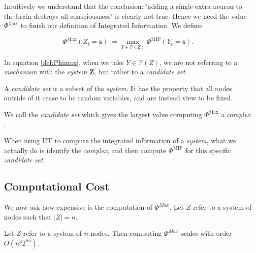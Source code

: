 Intuitively we understand that the conclusion: `adding a single extra neuron to the brain destroys all consciousness' is clearly not true. Hence we need the value $\Phi^{\text{Max}}$ to finish our definition of Integrated Information. We define:

\begin{equation}
\label{def:Phimax}
\Phi^{\text{Max}}(Z_t = \mathbf{s}) := \max \limits_{Y \in \mathbb{P}(Z)}\Phi^{\text{MIP}} (Y_t = \mathbf{s}).
\end{equation}

In equation \ref{def:Phimax}, when we take $Y \in \mathbb{P}(Z)$, we are not referring to a \textit{mechanism} with the \textit{system} $\mathbf{Z}$, but rather to a \textit{candidate set}.

\begin{definition}
	A \textit{candidate set} \cite{oizumi2014phenomenology} is a subset of the \textit{system}. It has the property that all nodes outside of it cease to be random variables, and are instead view to be fixed.  
\end{definition}

\begin{definition}
	We call the \textit{candidate set} which gives the largest value computing $\Phi^{\text{Max}}$ a \textit{complex} \cite{oizumi2014phenomenology}.
\end{definition}

When using IIT to compute the integrated information of a \textit{system}, what we actually do is identify the \textit{complex}, and then compute $\Phi^{\text{MIP}}$ for this specific \textit{candidate set}.

\subsection{Computational Cost}
We now ask how expensive is the computation of $\Phi^{Max}$. Let $Z$ refer to a system of nodes such that $|Z| = n$.

\begin{theorem}
	Let $Z$ refer to a system of $n$ nodes. Then computing $\Phi^{Max}$ scales with order $O(n^3 2^{8n})$.
\end{theorem}

